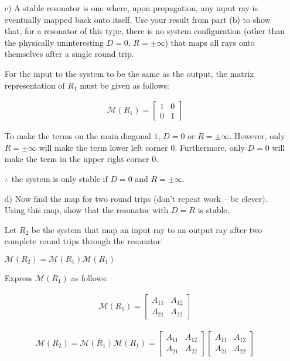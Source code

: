 \documentclass[fleqn]{article}
\begin{document}
\begin{enumerate}[nolistsep]
			\item[c)] A stable resonator is one where, upon propagation, any input ray is eventually mapped back onto itself. Use your result from part (b) to show that, for a resonator of this type, there is no system configuration (other than the physically uninteresting $D = 0$, $R = \pm \infty$) that maps all rays onto themselves after a single round trip.
			
			For the input to the system to be the same as the output, the matrix representation of $R_1$ must be given as follows:
			
			\begin{align*}
				\mathcal{M}(R_1) = \begin{bmatrix}1 & 0\\ 0 & 1\end{bmatrix}
			\end{align*}
			
			To make the terms on the main diagonal $1$, $D = 0$ or $R = \pm\infty$. However, only $R = \pm\infty$ will make the term lower left corner $0$. Furthermore, only $D = 0$ will make the term in the upper right corner $0$.
			
			$\therefore$ the system is only stable if $D=0$ and $R=\pm\infty$.			
			
			\pagebreak
			\item[d)] Now find the map for two round trips (don’t repeat work – be clever). Using this map, show that the resonator with $D = R$ is stable.
			
			Let $R_2$ be the system that map an input ray to an output ray after two complete round trips through the resonator.
			
			$\mathcal{M}(R_2) = \mathcal{M}(R_1)\mathcal{M}(R_1)$
			
			Express $\mathcal{M}(R_1)$ as follows:
			
			\begin{align*}
				\mathcal{M}(R_1) = \begin{bmatrix}A_{11} & A_{12}\\ A_{21} & A_{22}\end{bmatrix}
			\end{align*}
			
			\begin{align*}
				\mathcal{M}(R_2) = \mathcal{M}(R_1)\mathcal{M}(R_1) = \begin{bmatrix}A_{11} & A_{12}\\ A_{21} & A_{22}\end{bmatrix}\begin{bmatrix}A_{11} & A_{12}\\ A_{21} & A_{22}\end{bmatrix}
			\end{align*}
			

\end{enumerate}
\end{document}
